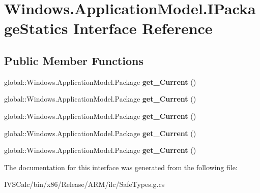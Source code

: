 \hypertarget{interface_windows_1_1_application_model_1_1_i_package_statics}{}\section{Windows.\+Application\+Model.\+I\+Package\+Statics Interface Reference}
\label{interface_windows_1_1_application_model_1_1_i_package_statics}
\subsection*{Public Member Functions}
\begin{DoxyCompactItemize}
\item 
\mbox{\label{interface_windows_1_1_application_model_1_1_i_package_statics_ad32131341c6b9e1d18caa22f56aefad0}} 
global\+::\+Windows.\+Application\+Model.\+Package {\bfseries get\+\_\+\+Current} ()
\item 
\mbox{\label{interface_windows_1_1_application_model_1_1_i_package_statics_ad32131341c6b9e1d18caa22f56aefad0}} 
global\+::\+Windows.\+Application\+Model.\+Package {\bfseries get\+\_\+\+Current} ()
\item 
\mbox{\label{interface_windows_1_1_application_model_1_1_i_package_statics_ad32131341c6b9e1d18caa22f56aefad0}} 
global\+::\+Windows.\+Application\+Model.\+Package {\bfseries get\+\_\+\+Current} ()
\item 
\mbox{\label{interface_windows_1_1_application_model_1_1_i_package_statics_ad32131341c6b9e1d18caa22f56aefad0}} 
global\+::\+Windows.\+Application\+Model.\+Package {\bfseries get\+\_\+\+Current} ()
\item 
\mbox{\label{interface_windows_1_1_application_model_1_1_i_package_statics_ad32131341c6b9e1d18caa22f56aefad0}} 
global\+::\+Windows.\+Application\+Model.\+Package {\bfseries get\+\_\+\+Current} ()
\end{DoxyCompactItemize}


The documentation for this interface was generated from the following file\+:\begin{DoxyCompactItemize}
\item 
I\+V\+S\+Calc/bin/x86/\+Release/\+A\+R\+M/ilc/Safe\+Types.\+g.\+cs\end{DoxyCompactItemize}

